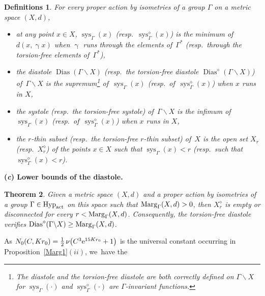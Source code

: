 \documentclass[pdftex]{sigma}
\numberwithin{equation}{section}
\newtheorem{theor}{Theorem}[section]
\newtheorem{defis}[theor]{Definitions}
\newcommand{\sys}{\operatorname{sys}}
\newcommand{\dias}{\operatorname{Dias}}
\newcommand{\g}{\operatorname{\gamma}}
\begin{document}
\begin{defis}%
For every proper action by isometries of a group $\Gamma$ on a metric space $(X,d)$,

\begin{itemize}\itemsep=0pt
\item at any point $x \in X$, $\sys_\Gamma (x)$ (resp.\ $\sys^{\diamond}_\Gamma (x)$) is the minimum of~$d(x, \g x)$ when $\g$ runs through the elements of~$\Gamma^*$ (resp.\ through the torsion-free elements of~$\Gamma^*$),

\item the diastole $\dias (\Gamma \backslash X)$ (resp.\ the torsion-free diastole $\dias^{\diamond} (\Gamma \backslash X)$) of~$\Gamma \backslash X$ is the supremum\footnote{The diastole and the torsion-free diastole are both correctly defined on $\Gamma \backslash X$ for $\sys_\Gamma (\cdot)$ and
$\sys^{\diamond}_\Gamma (\cdot)$ are $\Gamma$-invariant functions.} of~$\sys_\Gamma (x)$ (resp.\ of~$\sys^{\diamond}_\Gamma (x)$)
when $x$ runs in $X$,

\item the systole (resp.\ the torsion-free systole) of~$\Gamma \backslash X$ is the infimum of~$\sys_\Gamma (x)$ (resp.\ of~$\sys^{\diamond}_\Gamma (x)$)
when $x$ runs in $X$,

\item the $ r$-thin subset (resp.\ the torsion-free $ r$-thin subset) of~$X$ is the open set $ X_r$ (resp.\ $ X^{\diamond}_r $) of the points $x \in
X$ such that
$\sys_\Gamma (x) < r$ (resp.\ such that $\sys^{\diamond}_\Gamma (x) < r$).
\end{itemize}
\end{defis}

\medskip\noindent
{\bf (\emph{c}) Lower bounds of the diastole.}

\begin{theor}\label{transyst0}
Given a metric space $(X,d)$ and a proper action by isometries of a group $\Gamma \in \text{\rm Hyp}_{\rm act}$ on this space
such that ${\rm Marg}_\Gamma (X,d) > 0$, then $X^{\diamond}_{r}$ is empty or disconnected for every $r < {\rm Marg}_\Gamma (X,d)$.
Consequently, the torsion-free diastole verifies $\dias^{\diamond} (\Gamma \backslash X) \ge {\rm Marg}_\Gamma (X,d)$.
\end{theor}

As $N_0 (C, Kr_0)= \frac{1}{2} \,\nu \big(C^3 {\rm e}^{15 K r_0} + 1\big)$ is the universal constant occurring in Proposition~\ref{Marg1}$(ii)$, we~have the
\end{document}
